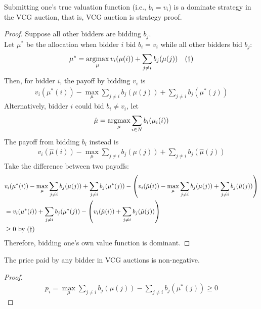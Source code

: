 \documentclass{article}
\begin{document}
	\begin{proposition}
		Submitting one's true valuation function (i.e., $b_i = v_i$) is a dominate strategy in the VCG auction, that is, VCG auction is strategy proof.
	\end{proposition}
	
	\begin{proof}
		Suppose all other bidders are bidding $b_j$. \\
		Let $\mu^*$ be the allocation when bidder $i$ bid $b_i = v_i$ while all other bidders bid $b_j$:
		\begin{align}
			\mu^* = \operatorname*{argmax}_\mu v_i(\mu(i)) + \sum_{j\neq i} b_j(\mu(j))\quad (\dagger)
		\end{align}
		Then, for bidder $i$, the payoff by bidding $v_i$ is
		\begin{align}
			v_i(\mu^*(i)) - \max_\mu \sum_{j \neq i} b_j(\mu(j)) + \sum_{j \neq i}b_j(\mu^*(j))
		\end{align}
		Alternatively, bidder $i$ could bid $b_i \neq v_i$, let
		\begin{align}
			\hat{\mu} = \operatorname*{argmax}_\mu \sum_{i \in N} b_i(\mu_i(i))
		\end{align}
		The payoff from bidding $b_i$ instead is
		\begin{align}
			v_i(\hat{\mu}(i)) -  \max_\mu \sum_{j \neq i} b_j(\mu(j)) + \sum_{j \neq i}b_j(\hat{\mu}(j))
		\end{align}
		Take the difference between two payoffs:
		\begin{align}
			&v_i(\mu^*(i)) - \max_\mu \sum_{j \neq i} b_j(\mu(j)) + \sum_{j \neq i}b_j(\mu^*(j))
			- \left(
			v_i(\hat{\mu}(i)) -  \max_\mu \sum_{j \neq i} b_j(\mu(j)) + \sum_{j \neq i}b_j(\hat{\mu}(j))
			\right) \\
			&= v_i(\mu^*(i)) + \sum_{j \neq i}b_j(\mu^*(j)) - \left(v_i(\hat{\mu}(i)) + \sum_{j \neq i}b_j(\hat{\mu}(j))
			\right) \\
			&\geq 0 \text{{ by }} (\dagger)
		\end{align}
		Therefore, bidding one's own value function is dominant.
	\end{proof}
	
	\begin{proposition}
		The price paid by any bidder in VCG auctions is non-negative.
	\end{proposition}
	
	\begin{proof}
		\begin{align}
			p_i = \max_\mu \sum_{j \neq i} b_j(\mu(j)) - \sum_{j \neq i}b_j(\mu^*(j)) \geq 0
		\end{align}
	\end{proof}
	
\end{document}
